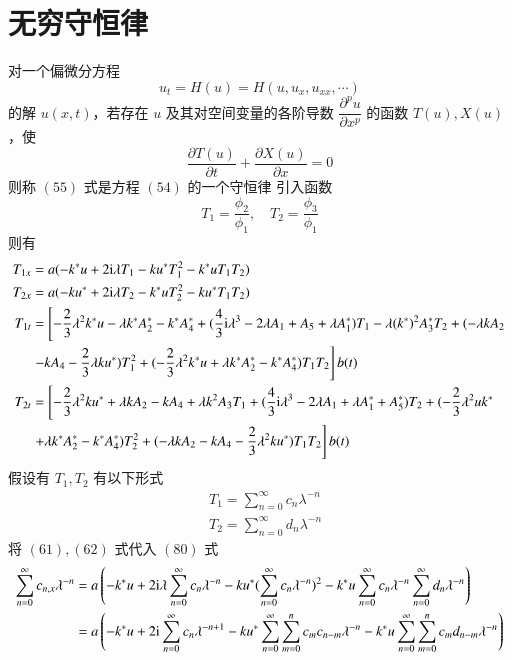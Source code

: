 \section{无穷守恒律}
对一个偏微分方程
\begin{equation}
  u_{t} = H(u) = H(u, u_{x}, u_{xx},\cdots)
\end{equation}
的解 $u(x,t)$，若存在 $u$ 及其对空间变量的各阶导数 $\dfrac{\partial^{p}u}{\partial x^{p}}$ 的函数 $T(u), X(u)$，使
\begin{equation}
  \frac{\partial T(u)}{\partial t} + \frac{\partial X(u)}{\partial x} = 0
\end{equation}
则称 $(55)$ 式是方程 $(54)$ 的一个守恒律
引入函数
\begin{equation}
  T_{1} = \frac{\phi_{2}}{\phi_{1}}, \quad T_{2} = \frac{\phi_{3}}{\phi_{1}}
\end{equation}
则有
\begin{align}
  T_{1x} &= a(-k^{*}u + 2\mathrm{i}\lambda T_{1} - ku^{*}T_{1}^{2} - k^{*}uT_{1}T_{2}) \\
  T_{2x} &= a(-ku^{*} + 2\mathrm{i}\lambda T_{2} - k^{*}uT_{2}^{2} - ku^{*}T_{1}T_{2}) \\
  T_{1t} &= \left[-\frac{2}{3}\lambda^{2}k^{*}u - \lambda k^{*}A_{2}^{*} - k^{*}A_{4}^{*} + (\frac{4}{3}\mathrm{i}\lambda^{3}-2\lambda A_{1}+A_{5}+\lambda A_{1}^{*})T_{1} - \lambda (k^{*})^{2}A_{3}^{*}T_{2} + (-\lambda kA_{2} \right.\notag\\
  & \left. - kA_{4} - \frac{2}{3}\lambda ku^{*})T_{1}^{2} + (-\frac{2}{3}\lambda^{2}k^{*}u+\lambda k^{*}A_{2}^{*}-k^{*}A_{4}^{*})T_{1}T_{2} \right]b(t) \\
  T_{2t} &= \left[-\frac{2}{3}\lambda^{2}ku^{*} + \lambda kA_{2} - kA_{4} + \lambda k^{2}A_{3}T_{1} + (\frac{4}{3}\mathrm{i}\lambda^{3}-2\lambda A_{1}+\lambda A_{1}^{*}+A_{5}^{*})T_{2} + (-\frac{2}{3}\lambda^{2}uk^{*} \right. \notag\\
  & \left. +\lambda k^{*}A_{2}^{*}-k^{*}A_{4}^{*})T_{2}^{2} + (-\lambda kA_{2}-kA_{4}-\frac{2}{3}\lambda^{2}ku^{*})T_{1}T_{2} \right]b(t)
\end{align}
假设有 $T_{1}, T_{2}$ 有以下形式
\begin{align}
  & T_{1} = \sum_{n=0}^{\infty}c_{n}\lambda^{-n} \\
  & T_{2} = \sum_{n=0}^{\infty}d_{n}\lambda^{-n}
\end{align}
将 $(61), (62)$ 式代入 $(80)$ 式
\begin{align}
  \sum_{n=0}^{\infty}c_{n,x}\lambda^{-n} &= a\left(-k^{*}u + 2\mathrm{i}\lambda\sum_{n=0}^{\infty}c_{n}\lambda^{-n} - ku^{*}(\sum_{n=0}^{\infty}c_{n}\lambda^{-n})^{2} - k^{*}u\sum_{n=0}^{\infty}c_{n}\lambda^{-n}\sum_{n=0}^{\infty}d_{n}\lambda^{-n}\right) \notag\\
  &= a\left(-k^{*}u + 2\mathrm{i}\sum_{n=0}^{\infty}c_{n}\lambda^{-n+1} - ku^{*}\sum_{n=0}^{\infty}\sum_{m=0}^{n}c_{m}c_{n-m}\lambda^{-n} - k^{*}u\sum_{n=0}^{\infty}\sum_{m=0}^{n}c_{m}d_{n-m}\lambda^{-n}\right)
\end{align}
